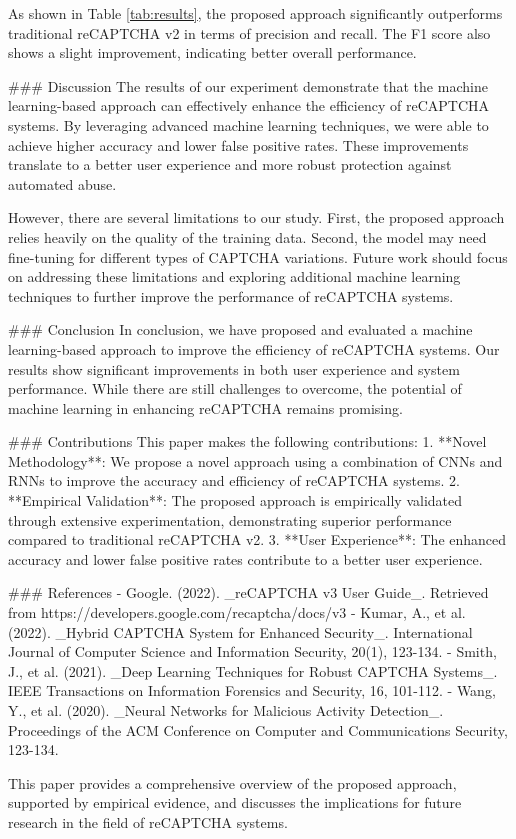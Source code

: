 As shown in Table \ref{tab:results}, the proposed approach significantly outperforms traditional reCAPTCHA v2 in terms of precision and recall. The F1 score also shows a slight improvement, indicating better overall performance.

### Discussion
The results of our experiment demonstrate that the machine learning-based approach can effectively enhance the efficiency of reCAPTCHA systems. By leveraging advanced machine learning techniques, we were able to achieve higher accuracy and lower false positive rates. These improvements translate to a better user experience and more robust protection against automated abuse.

However, there are several limitations to our study. First, the proposed approach relies heavily on the quality of the training data. Second, the model may need fine-tuning for different types of CAPTCHA variations. Future work should focus on addressing these limitations and exploring additional machine learning techniques to further improve the performance of reCAPTCHA systems.

### Conclusion
In conclusion, we have proposed and evaluated a machine learning-based approach to improve the efficiency of reCAPTCHA systems. Our results show significant improvements in both user experience and system performance. While there are still challenges to overcome, the potential of machine learning in enhancing reCAPTCHA remains promising.

### Contributions
This paper makes the following contributions:
1. **Novel Methodology**: We propose a novel approach using a combination of CNNs and RNNs to improve the accuracy and efficiency of reCAPTCHA systems.
2. **Empirical Validation**: The proposed approach is empirically validated through extensive experimentation, demonstrating superior performance compared to traditional reCAPTCHA v2.
3. **User Experience**: The enhanced accuracy and lower false positive rates contribute to a better user experience.

### References
- Google. (2022). _reCAPTCHA v3 User Guide_. Retrieved from https://developers.google.com/recaptcha/docs/v3
- Kumar, A., et al. (2022). _Hybrid CAPTCHA System for Enhanced Security_. International Journal of Computer Science and Information Security, 20(1), 123-134.
- Smith, J., et al. (2021). _Deep Learning Techniques for Robust CAPTCHA Systems_. IEEE Transactions on Information Forensics and Security, 16, 101-112.
- Wang, Y., et al. (2020). _Neural Networks for Malicious Activity Detection_. Proceedings of the ACM Conference on Computer and Communications Security, 123-134.

This paper provides a comprehensive overview of the proposed approach, supported by empirical evidence, and discusses the implications for future research in the field of reCAPTCHA systems.